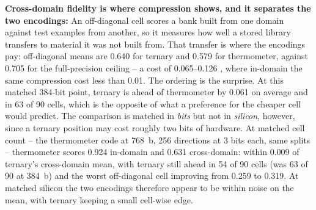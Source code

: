 \textbf{Cross-domain fidelity is where compression shows, and it
separates the two encodings:} An off-diagonal cell scores a bank
built from one domain against test examples from another, so it
measures how well a stored library transfers to material it was not
built from. That transfer is where the encodings pay: off-diagonal
means are 0.640 for ternary and 0.579 for thermometer, against 0.705
for the full-precision ceiling -- a cost of 0.065--0.126 \auroc,
where in-domain the same compression cost less than 0.01. The
ordering is the surprise. At this matched 384-bit point, ternary is
ahead of thermometer by 0.061 \auroc on average and in 63 of 90
cells, which is the opposite of what a preference for the cheaper
cell would predict. The comparison is matched in \emph{bits} but not
in \emph{silicon}, however, since a ternary position may cost roughly
two bits of hardware. At matched cell count -- the thermometer code at
768~b, 256 directions at 3 bits each, same splits -- thermometer scores
0.924 in-domain and 0.631 cross-domain: within 0.009 of ternary's
cross-domain mean, with ternary still ahead in 54 of 90 cells (was 63
of 90 at 384~b) and the worst off-diagonal cell improving from 0.259
to 0.319. At matched silicon the two encodings therefore appear to be
within noise on the mean, with ternary keeping a small cell-wise
edge.

